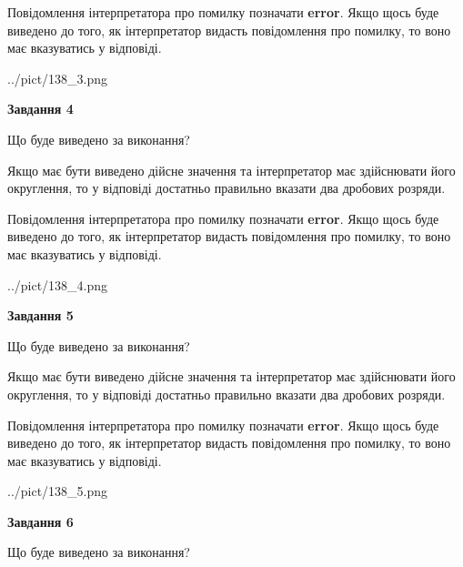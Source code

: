 \documentclass[12pt, ukrainian]{article}
\begin{document}
{\begin {Large}
Повідомлення інтерпретатора про помилку позначати \textbf{error}.
Якщо щось буде виведено до того, як інтерпретатор видасть повідомлення про помилку, 
то воно має вказуватись у відповіді. \par

\begin{center}
	{../pict/138_3.png}
\end{center}
\newpage

{\begin {center}\textbf{Завдання 4}\end {center}}\par
Що буде виведено за виконання? \par

Якщо має бути виведено дійсне значення та інтерпретатор має здійснювати його округлення, 
то у відповіді достатньо правильно вказати два дробових розряди.

Повідомлення інтерпретатора про помилку позначати \textbf{error}.
Якщо щось буде виведено до того, як інтерпретатор видасть повідомлення про помилку, 
то воно має вказуватись у відповіді. \par

\begin{center}
	{../pict/138_4.png}
\end{center}
\newpage

{\begin {center}\textbf{Завдання 5}\end {center}}\par
Що буде виведено за виконання? \par

Якщо має бути виведено дійсне значення та інтерпретатор має здійснювати його округлення, 
то у відповіді достатньо правильно вказати два дробових розряди.

Повідомлення інтерпретатора про помилку позначати \textbf{error}.
Якщо щось буде виведено до того, як інтерпретатор видасть повідомлення про помилку, 
то воно має вказуватись у відповіді. \par

\begin{center}
	{../pict/138_5.png}
\end{center}
\newpage

{\begin {center}\textbf{Завдання 6}\end {center}}\par
Що буде виведено за виконання? \par


\end{Large}}
\end{document}
